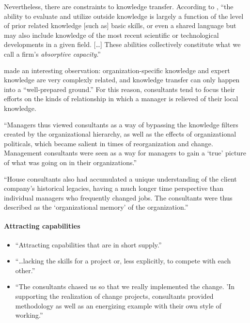 \documentclass[12pt]{article}
\providecommand{\tightlist}{%
  \setlength{\itemsep}{0pt}\setlength{\parskip}{0pt}}
\begin{document}
Nevertheless, there are constraints to knowledge transfer. According to
\citet[128-129]{cohen1990}, ``the ability to evaluate and utilize
outside knowledge is largely a function of the level of prior related
knowledge {[}such as{]} basic skills, or even a shared language but may
also include knowledge of the most recent scientific or technological
developments in a given field. {[}\ldots{]} These abilities collectively
constitute what we call a firm's \emph{absorptive capacity}.''

\citet[84]{fincham2002} made an interesting observation:
organization-specific knowledge and expert knowledge are very complexly
related, and knowledge transfer can only happen into a ``well-prepared
ground.'' For this reason, consultants tend to focus their efforts on
the kinds of relationship in which a manager is relieved of their local
knowledge.

``Managers thus viewed consultants as a way of bypassing the knowledge
filters created by the organizational hierarchy, as well as the effects
of organizational politicals, which became salient in times of
reorganization and change. Management consultants were seen as a way for
managers to gain a `true' picture of what was going on in their
organizations.'' \citep[ 54]{werr2002}

``House consultants also had accumulated a unique understanding of the
client company's historical legacies, having a much longer time
perspective than individual managers who frequently changed jobs. The
consultants were thus described as the `organizational memory' of the
organization.''

\hypertarget{attracting-capabilities}{%
\paragraph{Attracting capabilities}\label{attracting-capabilities}}

\begin{itemize}
\tightlist
\item
  ``Attracting capabilities that are in short supply.''
  \citet[52]{aubert1996}
\item
  ``\ldots lacking the skills for a project or, less explicitly, to
  compete with each other.'' \citep[ 233]{sturdy1998}
\item
  ``The consultants chased us so that we really implemented the change.
  'In supporting the realization of change projects, consultants
  provided methodology as well as an energizing example with their own
  style of working.'' \citep[ 54]{werr2002}
\end{itemize}
\end{document}
